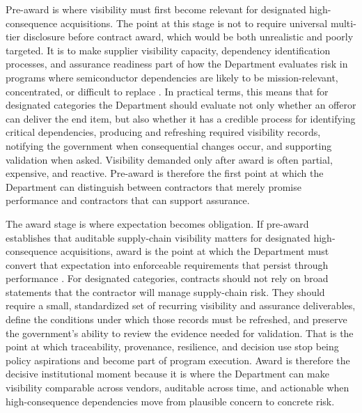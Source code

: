 Pre-award is where visibility must first become relevant for designated high-consequence acquisitions. The point at this stage is not to require universal multi-tier disclosure before contract award, which would be both unrealistic and poorly targeted. It is to make supplier visibility capacity, dependency identification processes, and assurance readiness part of how the Department evaluates risk in programs where semiconductor dependencies are likely to be mission-relevant, concentrated, or difficult to replace \parencite{ch5_dodi500085}. In practical terms, this means that for designated categories the Department should evaluate not only whether an offeror can deliver the end item, but also whether it has a credible process for identifying critical dependencies, producing and refreshing required visibility records, notifying the government when consequential changes occur, and supporting validation when asked. Visibility demanded only after award is often partial, expensive, and reactive. Pre-award is therefore the first point at which the Department can distinguish between contractors that merely promise performance and contractors that can support assurance.

The award stage is where expectation becomes obligation. If pre-award establishes that auditable supply-chain visibility matters for designated high-consequence acquisitions, award is the point at which the Department must convert that expectation into enforceable requirements that persist through performance \parencite{ch5_dodi500085,ch5_dfars2522467007,ch5_dfars2522467008}. For designated categories, contracts should not rely on broad statements that the contractor will manage supply-chain risk. They should require a small, standardized set of recurring visibility and assurance deliverables, define the conditions under which those records must be refreshed, and preserve the government's ability to review the evidence needed for validation. That is the point at which traceability, provenance, resilience, and decision use stop being policy aspirations and become part of program execution. Award is therefore the decisive institutional moment because it is where the Department can make visibility comparable across vendors, auditable across time, and actionable when high-consequence dependencies move from plausible concern to concrete risk.

